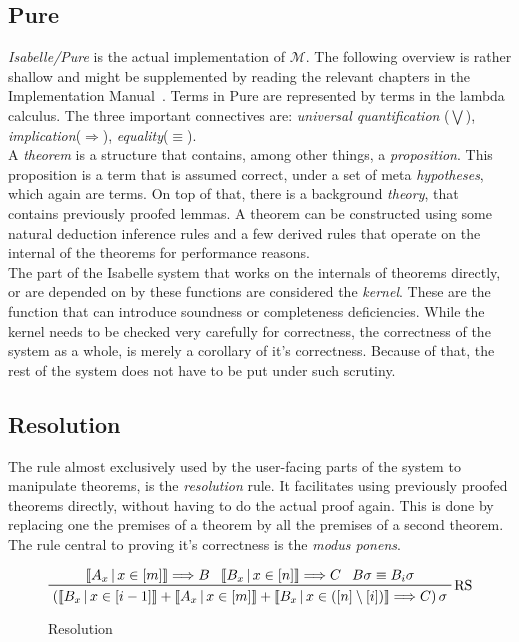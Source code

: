 \subsection{Pure}
\textit{Isabelle/Pure} is the actual implementation of $\mathcal{M}$. The following overview is rather shallow and might be supplemented by reading the relevant chapters in the Implementation Manual~\parencite{implementation}. Terms in Pure are represented by terms in the lambda calculus. The three important connectives are: \textit{universal quantification} ($\bigvee$), \textit{implication}($\Longrightarrow$), \textit{equality}($\equiv$).\\
A \textit{theorem} is a structure that contains, among other things, a \textit{proposition}. This proposition is a term that is assumed correct, under a set of meta \textit{hypotheses}, which again are terms. On top of that, there is a background \textit{theory}, that contains previously proofed lemmas. A theorem can be constructed using some natural deduction inference rules and a few derived rules that operate on the internal of the theorems for performance reasons.\\
The part of the Isabelle system that works on the internals of theorems directly, or are depended on by these functions are considered the \textit{kernel}. These are the function that can introduce soundness or completeness deficiencies. While the kernel needs to be checked very carefully for correctness, the correctness of the system as a whole, is merely a corollary of it's correctness. Because of that, the rest of the system does not have to be put under such scrutiny.
\subsection{Resolution}
The rule almost exclusively used by the user-facing parts of the system to manipulate theorems, is the \textit{resolution} rule. It facilitates using previously proofed theorems directly, without having to do the actual proof again. This is done by replacing one the premises of a theorem by all the premises of a second theorem. The rule central to proving it's correctness is the \textit{modus ponens}.
\begin{figure}[ht]
\begin{displaymath}
    \prftree[r]{RS}
    {\left\llbracket A_x\,\middle|\, x \in \left[ m \right] \right\rrbracket \Longrightarrow B}
    {\left\llbracket B_x\,\middle|\, x \in \left[ n \right] \right\rrbracket \Longrightarrow C}
    {B\sigma \equiv B_i\sigma}
    {\left( \left\llbracket B_x\,\middle|\, x \in \left[ i - 1 \right] \right\rrbracket
    + \left\llbracket A_x\,\middle|\, x \in \left[ m \right] \right\rrbracket
    + \left\llbracket B_x\,\middle|\, x \in \left( \left[ n \right] \setminus \left[ i \right] \right) \right\rrbracket
    \Longrightarrow C \right) \sigma
    }
\end{displaymath}
\caption{Resolution}
\label{fig:res}
\end{figure}

